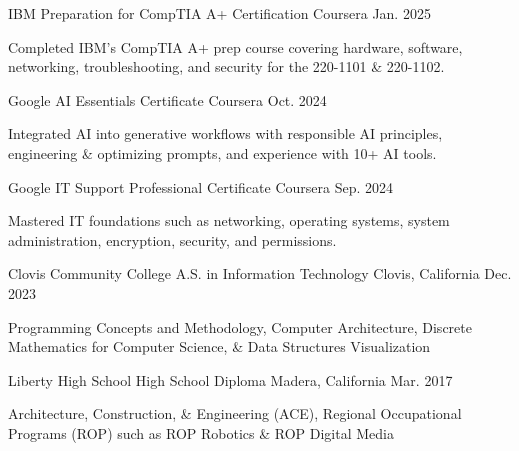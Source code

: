 \begin{cventries}

	\cventry
	{IBM} %
	{Preparation for CompTIA A+ Certification} %
	{Coursera} %
	{Jan. 2025} %
	{
		\begin{cvitems} %
		\item{Completed IBM's CompTIA A+ prep course covering hardware, software, networking, troubleshooting, and security for the 220-1101 \& 220-1102.}
		\end{cvitems}
	}

	\cventry
	{Google} %
	{AI Essentials Certificate} %
	{Coursera} %
	{Oct. 2024} %
	{
		\begin{cvitems} %
		\item{Integrated AI into generative workflows with responsible AI principles, engineering \& optimizing prompts, and experience with 10+ AI tools.}
		\end{cvitems}
	}

	\cventry
	{Google} %
	{IT Support Professional Certificate} %
	{Coursera} %
	{Sep. 2024} %
	{
		\begin{cvitems} %
		\item{Mastered IT foundations such as networking, operating systems, system administration, encryption, security, and permissions.}
		\end{cvitems}
	}

	\cventry
	{Clovis Community College} %
	{A.S. in Information Technology} %
	{Clovis, California} %
	{Dec. 2023} %
	{
		\begin{cvitems} %
		\item{Programming Concepts and Methodology, Computer Architecture, Discrete Mathematics for Computer Science, \& Data Structures Visualization}
		\end{cvitems}
	}

	\cventry
	  {Liberty High School} %
	  {High School Diploma} %
	  {Madera, California} %
	  {Mar. 2017} %
	  {
	    \begin{cvitems} %
	\item {Architecture, Construction, \& Engineering (ACE), Regional Occupational Programs (ROP) such as ROP Robotics \& ROP Digital Media}
	    \end{cvitems}
	  }
\end{cventries}
